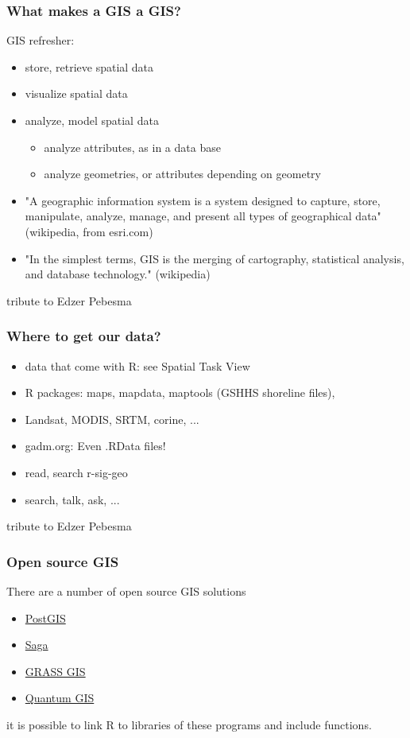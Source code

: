 \documentclass[xcolor=table, xcolor=dvipsnames]{beamer}\usepackage[]{graphicx}\usepackage[]{color}
\begin{document}

\begin{frame}[fragile]\frametitle{What makes a GIS a GIS?}
GIS refresher:
\begin{itemize}[<+->]
\item store, retrieve spatial data
\item visualize spatial data
\item analyze, model spatial data
\begin{itemize}
  \item analyze attributes, as in a data base
  \item analyze geometries, or attributes depending on geometry
\end{itemize}
\item "A geographic information system is a system designed to capture,
store, manipulate, analyze, manage, and present all types of
geographical data" (wikipedia, from esri.com)
\item "In the simplest terms, GIS is the merging of cartography,
statistical analysis, and database technology."  (wikipedia)
\end{itemize}
\tiny{tribute to Edzer Pebesma}
\end{frame}


\begin{frame}[fragile]\frametitle{Where to get our data?}
\begin{itemize}[<+->]
\item data that come with R: see Spatial Task View
\item R packages: maps, mapdata, maptools (GSHHS shoreline files),
\item Landsat, MODIS, SRTM, corine, ...
\item gadm.org: Even .RData files!
\item read, search r-sig-geo
\item search, talk, ask, ...
\end{itemize}
\tiny{tribute to Edzer Pebesma}
\end{frame}


\begin{frame}[fragile]\frametitle{Open source GIS}
There are a number of open source GIS solutions
\begin{itemize}[<+->]
\item \href{http://postgis.net/}{PostGIS}
\item \href{http://www.saga-gis.org/en/index.html}{Saga}
\item \href{http://grass.osgeo.org/}{GRASS GIS}
\item \href{http://qgis.org/en/site/}{Quantum GIS}
\end{itemize}
 it is possible to link R to libraries of these programs and include functions.
\end{frame}
\end{document}
